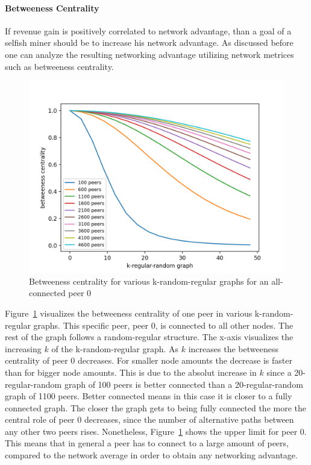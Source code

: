 \paragraph{Betweeness Centrality}
If revenue gain is positively correlated to network advantage, than a goal of a selfish miner should be to increase his network advantage. As discussed before one can analyze the resulting networking advantage utilizing network metrices such as betweeness centrality.
\begin{figure}[ht]
	\includegraphics[width=\textwidth]{figures/betweeness_centrality.png}
	\caption{Betweeness centrality for various k-random-regular graphs for an all-connected peer $0$}
	\label{fig:bet_cent}
\end{figure}
Figure~\ref{fig:bet_cent} visualizes the betweeness centrality of one peer in various k-random-regular graphs. This specific peer, peer $0$, is connected to all other nodes. The rest of the graph follows a random-regular structure. The x-axis visualizes the increasing $k$ of the k-random-regular graph. As $k$ increases the betweeness centrality of peer $0$ decreases. For smaller node amounts the decrease is faster than for bigger node amounts. This is due to the absolut increase in $k$ since a 20-regular-random graph of 100 peers is better connected than a 20-regular-random graph of 1100 peers. Better connected means in this case it is closer to a fully connected graph. The closer the graph gets to being fully connected the more the central role of peer $0$ decreases, since the number of alternative paths between any other two peers rises. Nonetheless, Figure~\ref{fig:bet_cent} shows the upper limit for peer $0$. This means that in general a peer has to connect to a large amount of peers, compared to the network average in order to obtain any networking advantage.

